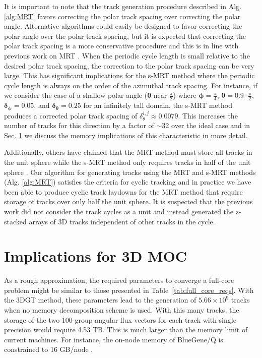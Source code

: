 It is important to note that the track generation procedure described in Alg. \ref{alg:MRT} favors correcting the polar track spacing over correcting the polar angle. Alternative algorithms could easily be designed to favor correcting the polar angle over the polar track spacing, but it is expected that correcting the polar track spacing is a more conservative procedure and this is in line with previous work on MRT \cite{kochunas}. When the periodic cycle length is small relative to the desired polar track spacing, the correction to the polar track spacing can be very large. This has significant implications for the s-MRT method where the periodic cycle length is always on the order of the azimuthal track spacing. For instance, if we consider the case of a shallow polar angle ($\boldsymbol{\theta}$ near $\frac{\pi}{2}$) where $\boldsymbol{\phi} = \frac{\pi}{4}$, $\boldsymbol{\theta} = 0.9 \cdot \frac{\pi}{2}$, $\boldsymbol{\delta_\phi} = 0.05$, and $\boldsymbol{\delta_\theta} = 0.25$ for an infinitely tall domain, the s-MRT method produces a corrected polar track spacing of $\delta_\theta^{i,j} \approx 0.0079$. This increases the number of tracks for this direction by a factor of $\sim$32 over the ideal case and in Sec. \ref{implications} we discuss the memory implications of this characteristic in more detail. 

Additionally, others have claimed that the MRT method must store all tracks in the unit sphere while the s-MRT method only requires tracks in half of the unit sphere \cite{kochunas}. Our algorithm for generating tracks using the MRT and s-MRT methods (Alg. \ref{alg:MRT}) satisfies the criteria for cyclic tracking and in practice we have been able to produce cyclic track laydowns for the MRT method that require storage of tracks over only half the unit sphere. It is suspected that the previous work did not consider the track cycles as a unit and instead generated the z-stacked arrays of 3D tracks independent of other tracks in the cycle.

\section{Implications for 3D MOC}
\label{implications}

As a rough approximation, the required parameters to converge a full-core problem might be similar to those presented in Table~\ref{tab:full_core_reqs}. With the 3DGT method, these parameters lead to the generation of $5.66 \times 10^9$ tracks when no memory decomposition scheme is used. With this many tracks, the storage of the two 100-group angular flux vectors for each track with single precision would require 4.53 TB. This is much larger than the memory limit of current machines. For instance, the on-node memory of BlueGene/Q is constrained to 16 GB/node \cite{BGQ}.

